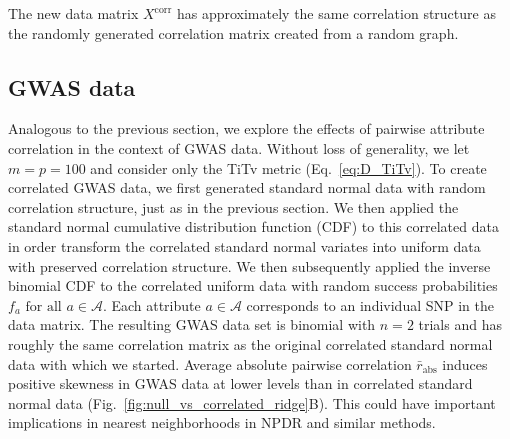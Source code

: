 \documentclass[10pt,letterpaper]{article}
\begin{document}
The new data matrix $X^\text{corr}$ has approximately the same correlation structure as the randomly generated correlation matrix created from a random graph.

\subsection{GWAS data}

Analogous to the previous section, we explore the effects of pairwise attribute correlation in the context of GWAS data. Without loss of generality, we let $m=p=100$ and consider only the TiTv metric (Eq.~\ref{eq:D_TiTv}). To create correlated GWAS data, we first generated standard normal data with random correlation structure, just as in the previous section. We then applied the standard normal cumulative distribution function (CDF) to this correlated data in order transform the correlated standard normal variates into uniform data with preserved correlation structure. We then subsequently applied the inverse binomial CDF to the correlated uniform data with random success probabilities $f_a \text{ for all } a \in \mathcal{A}$. Each attribute $a \in \mathcal{A}$ corresponds to an individual SNP in the data matrix. The resulting GWAS data set is binomial with $n=2$ trials and has roughly the same correlation matrix as the original correlated standard normal data with which we started. Average absolute pairwise correlation $\bar{r}_\text{abs}$ induces positive skewness in GWAS data at lower levels than in correlated standard normal data (Fig.~\ref{fig:null_vs_correlated_ridge}B). This could have important implications in nearest neighborhoods in NPDR and similar methods.
%
\end{document}
